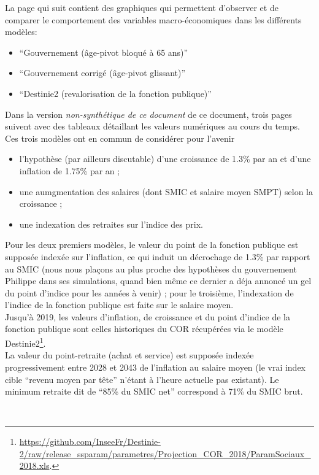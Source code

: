 La page qui suit contient des graphiques qui permettent d'observer et de comparer le comportement des variables macro-économiques dans les différents modèles:
\begin{itemize}
\item ``Gouvernement (âge-pivot bloqué à 65 ans)''
\item ``Gouvernement corrigé (âge-pivot glissant)''
\item ``Destinie2 (revalorisation de la fonction publique)''
\end{itemize}
Dans la version \emph{non-synthétique de ce document} de ce document, trois pages suivent avec des tableaux détaillant les valeurs numériques au cours du temps.\\
Ces trois modèles ont en commun de considérer pour l'avenir
\begin{itemize}
\item l'hypothèse (par ailleurs discutable) d'une croissance de 1.3\% par an et d'une inflation de 1.75\% par an ;
\item une aumgmentation des salaires (dont SMIC et salaire moyen SMPT) selon la croissance ;
\item une indexation des retraites sur l'indice des prix.
\end{itemize}
Pour les deux premiers modèles, le valeur du point de la fonction publique est supposée indexée sur l'inflation, ce qui induit un décrochage de 1.3\% par rapport au SMIC (nous nous plaçons au plus proche des hypothèses du gouvernement Philippe dans ses simulations, quand bien même ce dernier a déja annoncé un gel du point d'indice pour les années à venir) ; pour le troisième, l'indexation de l'indice de la fonction publique est faite sur le salaire moyen. \\
Jusqu'à 2019, les valeurs d'inflation, de croissance et du point d'indice de la fonction publique sont celles historiques du COR récupérées via le modèle Destinie2\footnote{\url{https://github.com/InseeFr/Destinie-2/raw/release_ssparam/parametres/Projection_COR_2018/ParamSociaux_2018.xls}.}. \\
La valeur du point-retraite (achat et service) est supposée indexée progressivement entre 2028 et 2043 de l'inflation au salaire moyen (le vrai index cible ``revenu moyen par tête'' n'étant à l'heure actuelle pas existant). Le minimum retraite dit de ``85\% du SMIC net'' correspond à 71\% du SMIC brut. 

~\\

